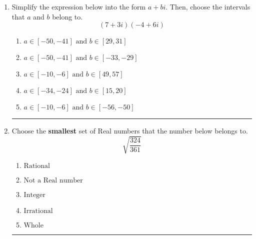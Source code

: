 \documentclass[14pt]{extbook}
\newcommand{\litem}[1]{\item#1\hspace*{-1cm}\rule{\textwidth}{0.4pt}}
\begin{document}
\begin{enumerate}
{\begin{enumerate}[label=\Alph*.]
\end{enumerate} }
\litem{
Simplify the expression below into the form $a+bi$. Then, choose the intervals that $a$ and $b$ belong to.\[ (7 + 3 i)(-4 + 6 i) \]\begin{enumerate}[label=\Alph*.]
\item \( a \in [-50, -41] \text{ and } b \in [29, 31] \)
\item \( a \in [-50, -41] \text{ and } b \in [-33, -29] \)
\item \( a \in [-10, -6] \text{ and } b \in [49, 57] \)
\item \( a \in [-34, -24] \text{ and } b \in [15, 20] \)
\item \( a \in [-10, -6] \text{ and } b \in [-56, -50] \)

\end{enumerate} }
\litem{
Choose the \textbf{smallest} set of Real numbers that the number below belongs to.\[ \sqrt{\frac{324}{361}} \]\begin{enumerate}[label=\Alph*.]
\item \( \text{Rational} \)
\item \( \text{Not a Real number} \)
\item \( \text{Integer} \)
\item \( \text{Irrational} \)
\item \( \text{Whole} \)

\end{enumerate} }
\end{enumerate}
\end{document}
